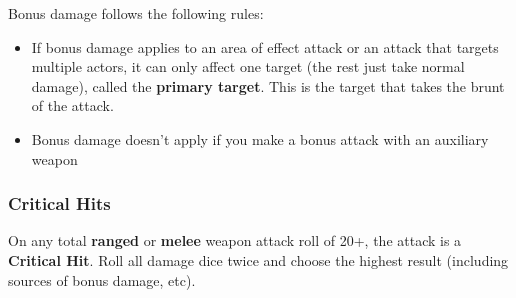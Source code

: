 Bonus damage follows the following rules:
\begin{itemize}
     \item If bonus damage applies to an area of effect attack or an attack that targets multiple actors, it can only affect one target (the rest just take normal damage), called the \textbf{primary target}. This is the target that takes the brunt of the attack.
     \item Bonus damage doesn’t apply if you make a bonus attack with an auxiliary weapon
\end{itemize}

\subsubsection{Critical Hits}
On any total \textbf{ranged} or \textbf{melee} weapon attack roll of 20+, the attack is a \textbf{Critical Hit}. Roll all damage dice twice and choose the highest result (including sources of bonus damage, etc).
